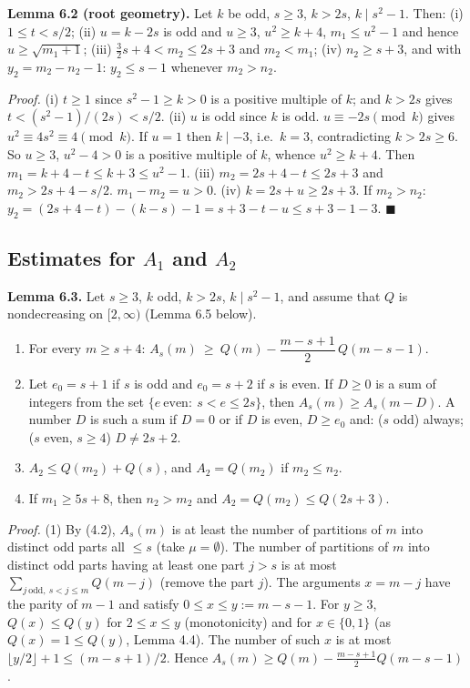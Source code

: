 \textbf{Lemma 6.2 (root geometry).} Let \(k\) be odd, \(s\ge3\), \(k>2s\), \(k\mid s^2-1\). Then: (i) \(1\le t<s/2\); (ii) \(u=k-2s\) is odd and \(u\ge3\), \(u^2\ge k+4\), \(m_1\le u^2-1\) and hence \(u\ge\sqrt{m_1+1}\); (iii) \(\tfrac32 s+4<m_2\le 2s+3\) and \(m_2<m_1\); (iv) \(n_2\ge s+3\), and with \(y_2=m_2-n_2-1\): \(y_2\le s-1\) whenever \(m_2>n_2\).

\emph{Proof.} (i) \(t\ge1\) since \(s^2-1\ge k>0\) is a positive multiple of \(k\); and \(k>2s\) gives \(t<(s^2-1)/(2s)<s/2\). (ii) \(u\) is odd since \(k\) is odd. \(u\equiv-2s\pmod k\) gives \(u^2\equiv4s^2\equiv4\pmod k\). If \(u=1\) then \(k\mid-3\), i.e.~\(k=3\), contradicting \(k>2s\ge6\). So \(u\ge3\), \(u^2-4>0\) is a positive multiple of \(k\), whence \(u^2\ge k+4\). Then \(m_1=k+4-t\le k+3\le u^2-1\). (iii) \(m_2=2s+4-t\le2s+3\) and \(m_2>2s+4-s/2\). \(m_1-m_2=u>0\). (iv) \(k=2s+u\ge2s+3\). If \(m_2>n_2\): \(y_2=(2s+4-t)-(k-s)-1=s+3-t-u\le s+3-1-3\). \(\blacksquare\)

\subsection{\texorpdfstring{Estimates for \(A_1\) and \(A_2\)}{Estimates for A\_1 and A\_2}}\label{estimates-for-a_1-and-a_2}

\textbf{Lemma 6.3.} Let \(s\ge3\), \(k\) odd, \(k>2s\), \(k\mid s^2-1\), and assume that \(Q\) is nondecreasing on \([2,\infty)\) (Lemma 6.5 below).

\begin{enumerate}
\def\labelenumi{\arabic{enumi}.}
\tightlist
\item
  For every \(m\ge s+4\): \(A_s(m)\ \ge\ Q(m)-\dfrac{m-s+1}{2}\,Q(m-s-1)\).
\item
  Let \(e_0=s+1\) if \(s\) is odd and \(e_0=s+2\) if \(s\) is even. If \(D\ge0\) is a sum of integers from the set \(\{e\ \text{even}:\ s<e\le2s\}\), then \(A_s(m)\ge A_s(m-D)\). A number \(D\) is such a sum if \(D=0\) or if \(D\) is even, \(D\ge e_0\) and: (\(s\) odd) always; (\(s\) even, \(s\ge4\)) \(D\ne2s+2\).
\item
  \(A_2\le Q(m_2)+Q(s)\), and \(A_2=Q(m_2)\) if \(m_2\le n_2\).
\item
  If \(m_1\ge5s+8\), then \(n_2>m_2\) and \(A_2=Q(m_2)\le Q(2s+3)\).
\end{enumerate}

\emph{Proof.} (1) By (4.2), \(A_s(m)\) is at least the number of partitions of \(m\) into distinct odd parts all \(\le s\) (take \(\mu=\emptyset\)). The number of partitions of \(m\) into distinct odd parts having at least one part \(j>s\) is at most \(\sum_{j\ \mathrm{odd},\ s<j\le m}Q(m-j)\) (remove the part \(j\)). The arguments \(x=m-j\) have the parity of \(m-1\) and satisfy \(0\le x\le y:=m-s-1\). For \(y\ge3\), \(Q(x)\le Q(y)\) for \(2\le x\le y\) (monotonicity) and for \(x\in\{0,1\}\) (as \(Q(x)=1\le Q(y)\), Lemma 4.4). The number of such \(x\) is at most \(\lfloor y/2\rfloor+1\le(m-s+1)/2\). Hence \(A_s(m)\ge Q(m)-\frac{m-s+1}2Q(m-s-1)\).

